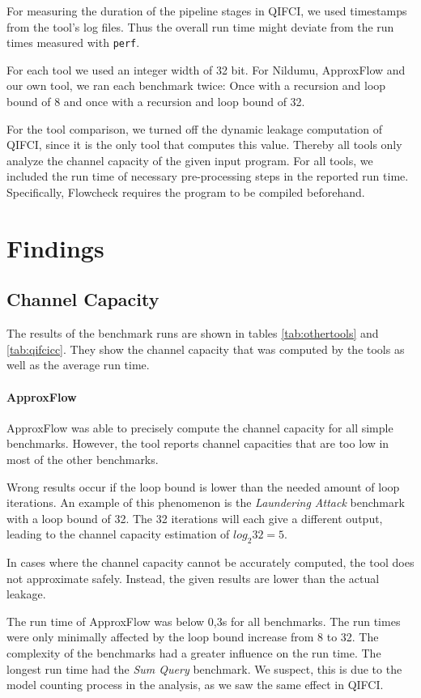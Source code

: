 For measuring the duration of the pipeline stages in QIFCI, we used timestamps from the tool's log files. Thus the overall run time might deviate from the run times measured with \texttt{perf}.

For each tool we used an integer width of 32 bit. For Nildumu, ApproxFlow and our own tool, we ran each benchmark twice: Once with a recursion and loop bound of 8 and once with a recursion and loop bound of 32.

For the tool comparison, we turned off the dynamic leakage computation of QIFCI, since it is the only tool that computes this value. Thereby all tools only analyze the channel capacity of the given input program. For all tools, we included the run time of necessary pre-processing steps in the reported run time. Specifically, Flowcheck requires the program to be compiled beforehand.

\section{Findings}

\subsection{Channel Capacity}
The results of the benchmark runs are shown in tables \ref{tab:othertools} and \ref{tab:qifcicc}. They show the channel capacity that was computed by the tools as well as the average run time.

\paragraph{ApproxFlow}
ApproxFlow was able to precisely compute the channel capacity for all simple benchmarks. However, the tool reports channel capacities that are too low in most of the other benchmarks.

Wrong results occur if the loop bound is lower than the needed amount of loop iterations. An example of this phenomenon is the \emph{Laundering Attack} benchmark with a loop bound of 32. The 32 iterations will each give a different output, leading to the channel capacity estimation of $log_2 32 = 5$.

In cases where the channel capacity cannot be accurately computed, the tool does not approximate safely. Instead, the given results are lower than the actual leakage.

The run time of ApproxFlow was below 0,3s for all benchmarks. The run times were only minimally affected by the loop bound increase from 8 to 32. The complexity of the benchmarks had a greater influence on the run time. The longest run time had the \emph{Sum Query} benchmark. We suspect, this is due to the model counting process in the analysis, as we saw the same effect in QIFCI.

